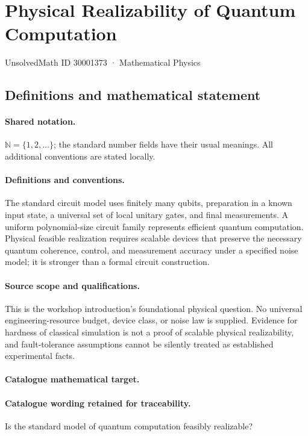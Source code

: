 \documentclass[11pt]{article}
\begin{document}
\setcounter{section}{30001372}
\section{Physical Realizability of Quantum Computation}\label{30001373}
{\small UnsolvedMath ID 30001373 · Mathematical Physics}
\subsection{Definitions and mathematical statement}

\paragraph{Shared notation.}$\mathbb N=\{1,2,\ldots\}$; the standard number fields have their usual meanings. All additional conventions are stated locally.


\paragraph{Definitions and conventions.} The standard circuit model uses finitely many qubits, preparation in a known input state, a universal set of local unitary gates, and final measurements. A uniform polynomial-size circuit family represents efficient quantum computation. Physical feasible realization requires scalable devices that preserve the necessary quantum coherence, control, and measurement accuracy under a specified noise model; it is stronger than a formal circuit construction.

\paragraph{Source scope and qualifications.} This is the workshop introduction's foundational physical question. No universal engineering-resource budget, device class, or noise law is supplied. Evidence for hardness of classical simulation is not a proof of scalable physical realizability, and fault-tolerance assumptions cannot be silently treated as established experimental facts.

\paragraph{Catalogue mathematical target.}
\paragraph{Catalogue wording retained for traceability.}
Is the standard model of quantum computation feasibly realizable?
\end{document}
